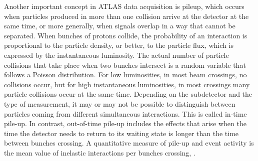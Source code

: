 Another important concept in \ac{ATLAS} data acquisition is pileup, which occurs when particles produced in more than one \pp collision arrive at the detector at the same time, or more generally, when signals overlap in a way that cannot be separated. When bunches of protons collide, the probability of an interaction is proportional to the particle density, or better, to the particle flux, which is expressed by the instantaneous luminosity. The actual number of particle collisions that take place when two bunches intersect is a random variable that follows a Poisson distribution. For low luminosities, in most beam crossings, no collisions occur, but for high instantaneous luminosities, in most crossings many particle collisions occur at the same time. Depending on the subdetector and the type of measurement, it may or may not be possible to distinguish between particles coming from different simultaneous interactions. This is called in-time pile-up. In contrast, out-of-time pile-up includes the effects that arise when the time the detector needs to return to its waiting state is longer than the time between bunches crossing. A quantitative measure of pile-up and event activity is the mean value of \pp inelastic interactions per bunches crossing, \avgmu.

